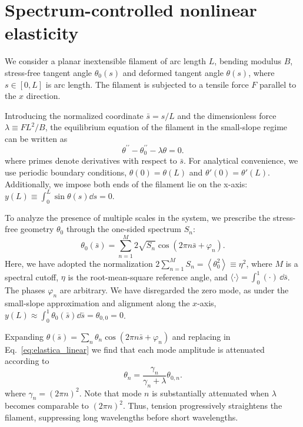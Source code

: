 \documentclass[pdflatex, twocolumn, sn-nature]{sn-jnl}
\begin{document}
\section*{Spectrum-controlled nonlinear elasticity}
\label{sec:main_theory}

We consider a planar inextensible filament of arc length $L$, bending modulus $B$, stress-free tangent angle $\theta_0(s)$ and deformed tangent angle $\theta(s)$, where $s\in[0,L]$ is arc length. The filament is subjected to a tensile force $F$ parallel to the $x$ direction. 

Introducing the normalized coordinate $\bar s=s/L$ and the dimensionless force $\lambda\equiv F L^2/B$, the equilibrium equation of the filament in the small-slope regime can be written as\cite{LandauLifshitzElasticity,AudolyPomeau}
\begin{equation}
\theta^{\prime\prime}-\theta^{\prime\prime}_0-\lambda\theta=0.
\label{eq:elastica_linear}
\end{equation}
where primes denote derivatives with respect to $\bar{s}$.
For analytical convenience, we use periodic boundary conditions, $\theta(0)=\theta(L)$ and $\theta'(0)=\theta'(L)$. 
Additionally, we impose both ends of the filament lie on the x-axis: $y(L)\equiv \int^L_0 \sin{\theta(s)} \dd s =0$.

To analyze the presence of multiple scales in the system, we prescribe the stress-free geometry $\theta_0$ through the one-sided spectrum $S_n$:
\begin{equation}
\theta_0(\bar{s})
=
\sum_{n=1}^{M}
2\sqrt{S_n}
\cos\left(
2\pi n \bar{s}+\varphi_n
\right).
\label{eq:geometry_main}
\end{equation}
Here, we have adopted the normalization $2\sum_{n=1}^{M}S_n
=
\left\langle\theta_0^2\right\rangle
\equiv\eta^2$, where $M$ is a spectral cutoff, $\eta$ is the root-mean-square reference angle, and $\langle\cdot\rangle=\int_0^1(\cdot)\,\dd \bar{s}$. 
The phases $\varphi_n$ are arbitrary.
We have disregarded the zero mode, as under the small-slope approximation and alignment along the $x$-axis, $y(L)\approx \int^1_0 \theta_0(\bar{s}) \dd \bar{s} = \theta_{0,0} = 0$.%

Expanding $\theta(\bar{s})=\sum_n\theta_n \cos\left(2\pi n \bar{s}+ \varphi_n\right)$  %
and replacing in Eq.~\eqref{eq:elastica_linear} we find that each mode amplitude is attenuated according to
\begin{equation}
\theta_n
=
\frac{\gamma_n}{\gamma_n+\lambda}
\theta_{0,n} .
\label{eq:filter_main}
\end{equation}
where $\gamma_n=(2\pi n)^2$.
Note that mode $n$ is substantially attenuated when $\lambda$ becomes comparable to $(2\pi n)^2$. 
Thus, tension progressively straightens the filament, suppressing long wavelengths before short wavelengths.
\end{document}
